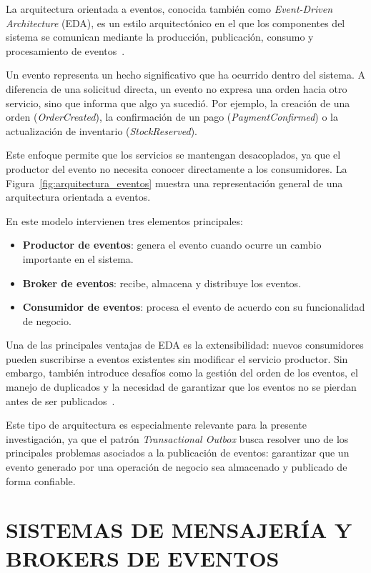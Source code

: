 La arquitectura orientada a eventos, conocida también como \textit{Event-Driven Architecture} (EDA), es un estilo arquitectónico en el que los componentes del sistema se comunican mediante la producción, publicación, consumo y procesamiento de eventos~\parencite{richardson2018}.

Un evento representa un hecho significativo que ha ocurrido dentro del sistema. A diferencia de una solicitud directa, un evento no expresa una orden hacia otro servicio, sino que informa que algo ya sucedió. Por ejemplo, la creación de una orden (\textit{OrderCreated}), la confirmación de un pago (\textit{PaymentConfirmed}) o la actualización de inventario (\textit{StockReserved}).

Este enfoque permite que los servicios se mantengan desacoplados, ya que el productor del evento no necesita conocer directamente a los consumidores. La Figura~\ref{fig:arquitectura_eventos} muestra una representación general de una arquitectura orientada a eventos.



En este modelo intervienen tres elementos principales:

\begin{itemize}
    \item \textbf{Productor de eventos}: genera el evento cuando ocurre un cambio importante en el sistema.
    \item \textbf{Broker de eventos}: recibe, almacena y distribuye los eventos.
    \item \textbf{Consumidor de eventos}: procesa el evento de acuerdo con su funcionalidad de negocio.
\end{itemize}

Una de las principales ventajas de EDA es la extensibilidad: nuevos consumidores pueden suscribirse a eventos existentes sin modificar el servicio productor. Sin embargo, también introduce desafíos como la gestión del orden de los eventos, el manejo de duplicados y la necesidad de garantizar que los eventos no se pierdan antes de ser publicados~\parencite{kleppmann2017}.

Este tipo de arquitectura es especialmente relevante para la presente investigación, ya que el patrón \textit{Transactional Outbox} busca resolver uno de los principales problemas asociados a la publicación de eventos: garantizar que un evento generado por una operación de negocio sea almacenado y publicado de forma confiable.

\section{SISTEMAS DE MENSAJERÍA Y BROKERS DE EVENTOS}


